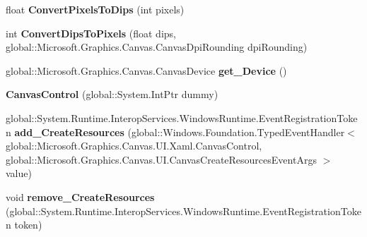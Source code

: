 \begin{DoxyCompactItemize}
\mbox{\label{class_microsoft_1_1_graphics_1_1_canvas_1_1_u_i_1_1_xaml_1_1_canvas_control_a2ce8d949d75e058b2815e29c1dbfbeae}} 
float {\bfseries Convert\+Pixels\+To\+Dips} (int pixels)
\item 
\mbox{\label{class_microsoft_1_1_graphics_1_1_canvas_1_1_u_i_1_1_xaml_1_1_canvas_control_a6f9406f13bc216c0fe902d20beb8d936}} 
int {\bfseries Convert\+Dips\+To\+Pixels} (float dips, global\+::\+Microsoft.\+Graphics.\+Canvas.\+Canvas\+Dpi\+Rounding dpi\+Rounding)
\item 
\mbox{\label{class_microsoft_1_1_graphics_1_1_canvas_1_1_u_i_1_1_xaml_1_1_canvas_control_a53150d7d2beb847f94799b8c1be75e7a}} 
global\+::\+Microsoft.\+Graphics.\+Canvas.\+Canvas\+Device {\bfseries get\+\_\+\+Device} ()
\item 
\mbox{\label{class_microsoft_1_1_graphics_1_1_canvas_1_1_u_i_1_1_xaml_1_1_canvas_control_a31a6da4afc396ee8034865c568463129}} 
{\bfseries Canvas\+Control} (global\+::\+System.\+Int\+Ptr dummy)
\item 
\mbox{\label{class_microsoft_1_1_graphics_1_1_canvas_1_1_u_i_1_1_xaml_1_1_canvas_control_ab026eb60db1a9fa4336dcb1ac14e4fb4}} 
global\+::\+System.\+Runtime.\+Interop\+Services.\+Windows\+Runtime.\+Event\+Registration\+Token {\bfseries add\+\_\+\+Create\+Resources} (global\+::\+Windows.\+Foundation.\+Typed\+Event\+Handler$<$ global\+::\+Microsoft.\+Graphics.\+Canvas.\+U\+I.\+Xaml.\+Canvas\+Control, global\+::\+Microsoft.\+Graphics.\+Canvas.\+U\+I.\+Canvas\+Create\+Resources\+Event\+Args $>$ value)
\item 
\mbox{\label{class_microsoft_1_1_graphics_1_1_canvas_1_1_u_i_1_1_xaml_1_1_canvas_control_aee51056da35ed3fa259233ef54dda668}} 
void {\bfseries remove\+\_\+\+Create\+Resources} (global\+::\+System.\+Runtime.\+Interop\+Services.\+Windows\+Runtime.\+Event\+Registration\+Token token)

\end{DoxyCompactItemize}
